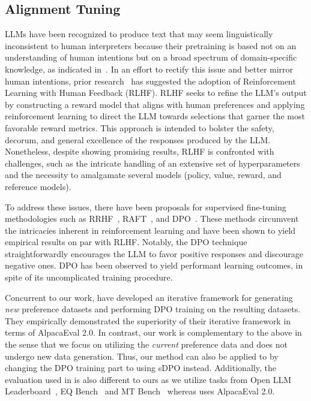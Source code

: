 \subsection{Alignment Tuning}
LLMs have been recognized to produce text that may seem linguistically inconsistent to human interpreters because their pretraining is based not on an understanding of human intentions but on a broad spectrum of domain-specific knowledge, as indicated in~\cite{ziegler2019fine}. In an effort to rectify this issue and better mirror human intentions, prior research~\cite{ziegler2019fine} has suggested the adoption of Reinforcement Learning with Human Feedback (RLHF). RLHF seeks to refine the LLM's output by constructing a reward model that aligns with human preferences and applying reinforcement learning to direct the LLM towards selections that garner the most favorable reward metrics. This approach is intended to bolster the safety, decorum, and general excellence of the responses produced by the LLM. Nonetheless, despite showing promising results, RLHF is confronted with challenges, such as the intricate handling of an extensive set of hyperparameters and the necessity to amalgamate several models (policy, value, reward, and reference models).

To address these issues, there have been proposals for supervised fine-tuning methodologies such as RRHF~\cite{yuan2023rrhf}, RAFT~\cite{dong2023raft}, and DPO~\cite{rafailov2023direct}. These methods circumvent the intricacies inherent in reinforcement learning and have been shown to yield empirical results on par with RLHF. Notably, the DPO technique straightforwardly encourages the LLM to favor positive responses and discourage negative ones. DPO has been observed to yield performant learning outcomes, in spite of its uncomplicated training procedure.

Concurrent to our work, \citet{yuan2024self} have developed an iterative framework for generating \textit{new} preference datasets and performing DPO training on the resulting datasets. They empirically demonstrated the superiority of their iterative framework in terms of AlpacaEval 2.0.
In contrast, our work is complementary to the above in the sense that we focus on utilizing the \textit{current} preference data and does not undergo new data generation. 
Thus, our method can also be applied to \citet{yuan2024self} by changing the DPO training part to using sDPO instead. 
Additionally, the evaluation used in \citet{yuan2024self} is also different to ours as we utilize tasks from Open LLM Leaderboard~\cite{open-llm-leaderboard}, EQ Bench~\cite{paech2023eq} and MT Bench~\cite{zheng2023judging} whereas \citet{yuan2024self} uses AlpacaEval 2.0.

